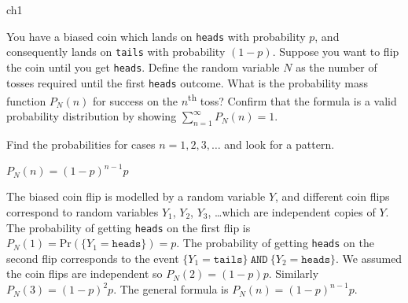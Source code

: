 \begin{problems}{ch1}

	\begin{problem}		\label{problem:geometric_distr_biased_coin_until_heads}
		You have a biased coin which lands on \texttt{heads} with probability $p$,
		and consequently lands on \texttt{tails} with probability $(1-p)$.
		Suppose you want to flip the coin until you get \texttt{heads}.
		Define the random variable $N$ as the number of tosses required until the first \texttt{heads} outcome.
		What is the probability mass function $P_N(n)$ for success on the $n$\textsuperscript{th} toss?
		Confirm that the formula is a valid probability distribution by showing $\sum_{n=1}^\infty P_N(n) = 1$.

		\begin{hint}
			Find the probabilities for cases $n=1,2,3,\ldots$ and look for a pattern.
		\end{hint}

		\begin{answer}$P_N(n) = (1-p)^{n-1}p$\end{answer}

		\begin{solution}
			The biased coin flip is modelled by a random variable $Y$,
			and different coin flips correspond to random variables $Y_1$, $Y_2$, $Y_3$, \ldots which are independent copies of $Y$.
			The probability of getting \texttt{heads} on the first flip is $P_N(1)=\textrm{Pr}\!\left( \{ Y_1=\texttt{heads} \} \right)\! =p$.
			The probability of getting \texttt{heads} on the second flip corresponds
			to the event $\{Y_1=\texttt{tails}\} \ \texttt{AND} \ \{Y_2=\texttt{heads} \}$.
			We assumed the coin flips are independent so %
			$P_N(2)=(1-p)p$.
			Similarly $P_N(3) = (1-p)^2p$.
			The general formula is $P_N(n) = (1-p)^{n-1}p$.
		\end{solution}
	\end{problem}


\end{problems}